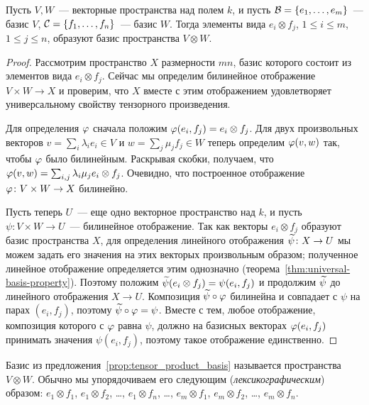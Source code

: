 \begin{proposition}\label{prop:tensor_product_basis}
Пусть $V,W$~--- векторные пространства над полем $k$, и пусть
$\mathcal B=\{e_1,\dots,e_m\}$~--- базис $V$,
$\mathcal C=\{f_1,\dots,f_n\}$~--- базис $W$.
Тогда элементы вида $e_i\otimes f_j$, $1\leq i\leq m$, $1\leq j\leq
n$, образуют базис пространства $V\otimes W$.
\end{proposition}
\begin{proof}
Рассмотрим пространство $X$ размерности $mn$, базис которого состоит
из элементов вида $e_i\otimes f_j$. Сейчас мы определим билинейное
отображение $V\times W\to X$ и проверим, что $X$ вместе с этим
отображением удовлетворяет универсальному свойству тензорного
произведения.

Для определения $\varphi$ сначала положим $\varphi(e_i,f_j) = e_i\otimes f_j$.
Для двух произвольных векторов $v = \sum_i\lambda_i e_i\in V$
и $w = \sum_j\mu_j f_j\in W$ теперь определим $\varphi(v,w)$ так,
чтобы $\varphi$ было билинейным. Раскрывая скобки, получаем, что
$\varphi(v,w) = \sum_{i,j}\lambda_i\mu_j e_i\otimes f_j$.
Очевидно, что построенное отображение $\varphi\colon V\times W\to X$
билинейно.

Пусть теперь $U$~--- еще одно векторное пространство над $k$, и пусть
$\psi\colon V\times W\to U$~--- билинейное отображение. Так как
векторы $e_i\otimes f_j$ образуют базис пространства $X$, для
определения линейного отображения $\widetilde\psi\colon X\to U$ мы можем
задать его значения на этих векторых произвольным образом; полученное
линейное отображение определяется этим однозначно
(теорема~\ref{thm:universal-basis-property}).
Поэтому положим $\widetilde\psi(e_i\otimes f_j) = \psi(e_i,f_j)$ и продолжим
$\widetilde\psi$ до линейного отображения $X\to U$. Композиция
$\widetilde\psi\circ\varphi$ билинейна и совпадает с $\psi$ на парах $(e_i,f_j)$,
поэтому $\widetilde\psi\circ\varphi = \psi$. Вместе с тем, любое отображение,
композиция которого с $\varphi$ равна $\psi$, должно на базисных векторах
$\varphi(e_i,f_j)$ принимать значения $\psi(e_i,f_j)$, поэтому такое
отображение единственно.
\end{proof}

\begin{definition}\label{dfn:tensor_basis}
Базис из предложения~\ref{prop:tensor_product_basis} называется
 пространства $V\otimes
W$. Обычно мы
упорядочиваем его следующим ({\em лексикографическим}) образом:
$e_1\otimes f_1$, $e_1\otimes f_2$, \dots, $e_1\otimes f_n$, \dots,
$e_m\otimes f_1$, $e_m\otimes f_2$, \dots, $e_m\otimes f_n$.
\end{definition}


